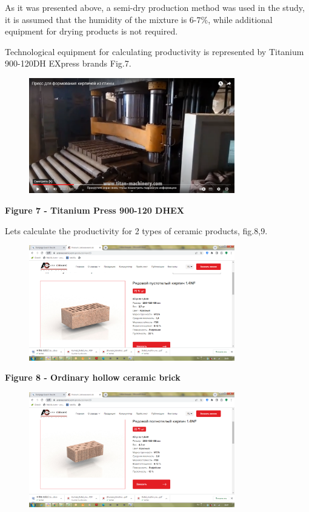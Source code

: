 As it was presented above, a semi-dry production method was used in the
study, it is assumed that the humidity of the mixture is 6-7\%, while
additional equipment for drying products is not required.

Technological equipment for calculating productivity is represented by
Titanium 900-120DH EXpress brands Fig.7.

\begin{figure}[H]
	\centering
	\includegraphics[width=0.8\textwidth]{assets/273}
	\caption*{}
\end{figure}

{\bfseries Figure 7 - Titanium Press 900-120 DHEX}

Let\textquotesingle s calculate the productivity for 2 types of ceramic
products, fig.8,9.

\begin{figure}[H]
	\centering
	\includegraphics[width=0.8\textwidth]{assets/274}
	\caption*{}
\end{figure}

{\bfseries Figure 8 - Ordinary hollow ceramic brick}

\begin{figure}[H]
	\centering
	\includegraphics[width=0.8\textwidth]{assets/275}
	\caption*{}
\end{figure}

